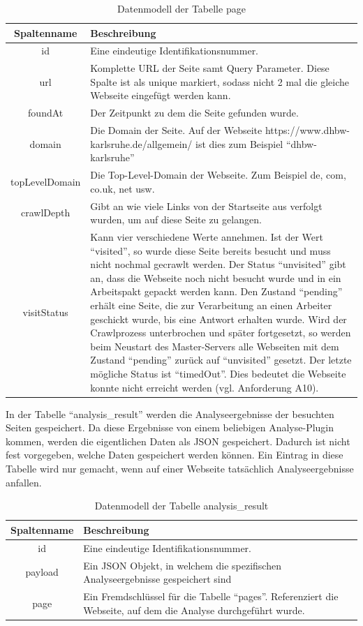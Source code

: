 \begin{table}
\begin{tabular}{c|p{10cm}}
	Spaltenname & Beschreibung  \\ 
	\hline\hline
	id & Eine eindeutige Identifikationsnummer. \\ 
	\hline 
	url & Komplette URL der Seite samt Query Parameter. Diese Spalte ist als unique markiert, sodass nicht 2 mal die gleiche Webseite eingefügt werden kann. \\
	\hline 
	foundAt & Der Zeitpunkt zu dem die Seite gefunden wurde. \\
	\hline 
	domain & Die Domain der Seite. Auf der Webseite https://www.dhbw-karlsruhe.de/allgemein/ ist dies zum Beispiel \enquote{dhbw-karlsruhe} \\
	\hline 
	topLevelDomain & Die Top-Level-Domain der Webseite. Zum Beispiel de, com, co.uk, net usw.  \\
	\hline 
	crawlDepth & Gibt an wie viele Links von der Startseite aus verfolgt wurden, um auf diese Seite zu gelangen. \\
	\hline 
	visitStatus & Kann vier verschiedene Werte annehmen. Ist der Wert \enquote{visited}, so wurde diese Seite bereits besucht und muss nicht nochmal gecrawlt werden. Der Status \enquote{unvisited} gibt an, dass die Webseite noch nicht besucht wurde und in ein Arbeitspakt gepackt werden kann. Den Zustand \enquote{pending} erhält eine Seite, die zur Verarbeitung an einen Arbeiter geschickt wurde, bis eine Antwort erhalten wurde. Wird der Crawlprozess unterbrochen und später fortgesetzt, so werden beim Neustart des Master-Servers alle Webseiten mit dem Zustand \enquote{pending} zurück auf \enquote{unvisited} gesetzt. Der letzte mögliche Status ist \enquote{timedOut}. Dies bedeutet die Webseite konnte nicht erreicht werden (vgl. Anforderung A10).\\
\end{tabular} 
\caption{Datenmodell der Tabelle page}
\end{table}


In der Tabelle \enquote{analysis\_result} werden die Analyseergebnisse der besuchten Seiten gespeichert. Da diese Ergebnisse von einem beliebigen Analyse-Plugin kommen, werden die eigentlichen Daten als JSON gespeichert. Dadurch ist nicht fest vorgegeben, welche Daten gespeichert werden können. Ein Eintrag in diese Tabelle wird nur gemacht, wenn auf einer Webseite tatsächlich Analyseergebnisse anfallen.

\begin{table}
\begin{tabular}{c|p{10.5cm}}
	Spaltenname & Beschreibung  \\ 
	\hline\hline
	id & Eine eindeutige Identifikationsnummer. \\ 
	\hline 
	payload & Ein JSON Objekt, in welchem die spezifischen Analyseergebnisse gespeichert sind \\
	\hline 
	page & Ein Fremdschlüssel für die Tabelle \enquote{pages}. Referenziert die Webseite, auf dem die Analyse durchgeführt wurde.  \\
\end{tabular} 
\caption{Datenmodell der Tabelle analysis\_result}
\end{table}


